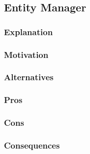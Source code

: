 \subsection{Entity Manager}
\subsubsection{Explanation}

\subsubsection{Motivation}

\subsubsection{Alternatives}

\subsubsection{Pros}

\subsubsection{Cons}

\subsubsection{Consequences}
